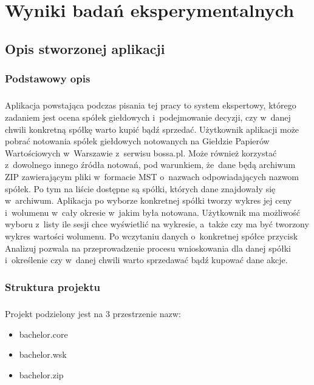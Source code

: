 \chapter{Wyniki badań eksperymentalnych}\label{chap:badania}

\section{Opis stworzonej aplikacji}

\subsection{Podstawowy opis}

\paragraph{}
Aplikacja powstająca podczas pisania tej pracy to system ekspertowy, którego zadaniem jest ocena spółek giełdowych i~podejmowanie decyzji, czy w~danej chwili konkretną spółkę warto kupić bądź sprzedać. Użytkownik aplikacji może pobrać notowania spółek giełdowych notowanych na Giełdzie Papierów Wartościowych w~Warszawie z~serwisu bossa.pl. Może również korzystać z~dowolnego innego źródła notowań, pod warunkiem, że~dane będą archiwum ZIP zawierającym pliki w~formacie MST o~nazwach odpowiadających nazwom spółek. Po tym na liście dostępne są spółki, których dane znajdowały się w~archiwum. Aplikacja po wyborze konkretnej spółki tworzy wykres jej ceny i~wolumenu w~cały okresie w~jakim była notowana. Użytkownik ma możliwość wyboru z~listy ile sesji chce wyświetlić na wykresie, a~także czy ma być tworzony wykres wartości wolumenu. Po wczytaniu danych o~konkretnej spółce przycisk Analizuj pozwala na przeprowadzenie procesu wnioskowania dla danej spółki i~określenie czy w~danej chwili warto sprzedawać bądź kupować dane akcje.

\subsection{Struktura projektu}

\paragraph{}
Projekt podzielony jest na 3 przestrzenie nazw:
\begin{itemize}
	\item bachelor.core
	\item bachelor.wsk
	\item bachelor.zip
\end{itemize}

